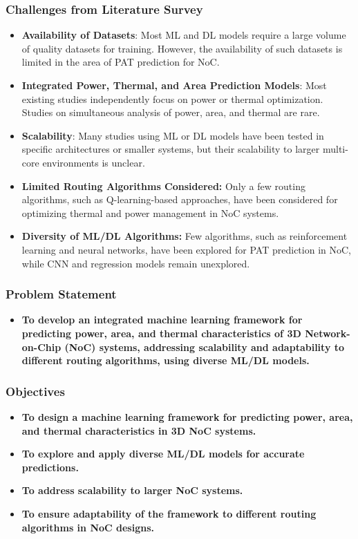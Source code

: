 \documentclass{beamer}
\begin{document}
\begin{frame}
\frametitle{Challenges from Literature Survey}

\begin{itemize}
    \item \textbf{Availability of Datasets}: Most ML and DL models require a large volume of quality datasets for training. However, the availability of such datasets is limited in the area of PAT prediction for NoC.
  
    \item \textbf{Integrated Power, Thermal, and Area Prediction Models}: Most existing studies independently focus on power or thermal optimization. Studies on simultaneous analysis of power, area, and thermal are rare.
  
    \item \textbf{Scalability}: Many studies using ML or DL models have been tested in specific architectures or smaller systems, but their scalability to larger multi-core environments is unclear.

    \item \textbf{Limited Routing Algorithms Considered:} Only a few routing algorithms, such as Q-learning-based approaches, have been considered for optimizing thermal and power management in NoC systems.

    \item \textbf{Diversity of ML/DL Algorithms:} Few algorithms, such as reinforcement learning and neural networks, have been explored for PAT prediction in NoC, while CNN and regression models remain unexplored.
\end{itemize}
\end{frame}

\begin{frame}
\frametitle{Problem Statement}

\begin{itemize}
    \item \textbf{To develop an integrated machine learning framework for predicting power, area, and thermal characteristics of 3D Network-on-Chip (NoC) systems, addressing scalability and adaptability to different routing algorithms, using diverse ML/DL models.}
\end{itemize}

\end{frame}

\begin{frame}
\frametitle{Objectives}

\begin{itemize}
    \item \textbf{To design a machine learning framework for predicting power, area, and thermal characteristics in 3D NoC systems.}
    \item \textbf{To explore and apply diverse ML/DL models for accurate predictions.}
    \item \textbf{To address scalability to larger NoC systems.}
    \item \textbf{To ensure adaptability of the framework to different routing algorithms in NoC designs.}
\end{itemize}

\end{frame}
\end{document}
